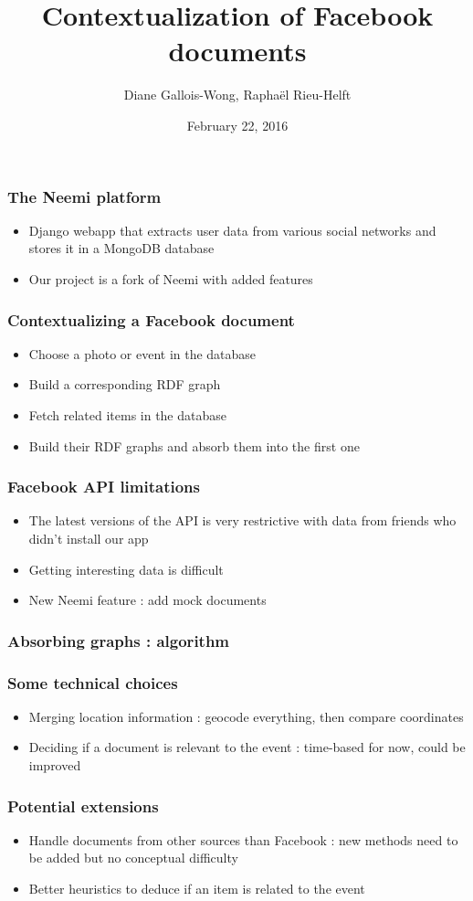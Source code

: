 \documentclass[18pt]{beamer}
\title{Contextualization of Facebook documents}
\author{Diane Gallois-Wong, Raphaël Rieu-Helft}
\date{February 22, 2016}
\begin{document}
\begin{frame}
	\titlepage
\end{frame}

\begin{frame}
	\frametitle{The Neemi platform}
\begin{itemize}
	\item{Django webapp that extracts user data from various social networks and stores it in a MongoDB database}
	\vspace{1em}
	\item{Our project is a fork of Neemi with added features}
\end{itemize}
\end{frame}

\begin{frame}
	\frametitle{Contextualizing a Facebook document}
	\begin{itemize}
		\item{Choose a photo or event in the database}
		\item{Build a corresponding RDF graph}
		\item{Fetch related items in the database}
		\item{Build their RDF graphs and absorb them into the first one}
	\end{itemize}
\end{frame}
\begin{frame}
	\frametitle{Facebook API limitations}
	\begin{itemize}
		\item{The latest versions of the API is very restrictive with data from friends who didn't install our app}
		\item{Getting interesting data is difficult}
		\item{New Neemi feature : add mock documents}
	\end{itemize}
\end{frame}
\begin{frame}
	\frametitle{Absorbing graphs : algorithm}
	
	
\end{frame}
\begin{frame}
	\frametitle{Some technical choices}
	\begin{itemize}
		\item{Merging location information : geocode everything, then compare coordinates}
		\item{Deciding if a document is relevant to the event : time-based for now, could be improved}
	\end{itemize}
\end{frame}
\begin{frame}
	\frametitle{Potential extensions}
	\begin{itemize}
		\item{Handle documents from other sources than Facebook : new methods need to be added but no conceptual difficulty}
		\item{Better heuristics to deduce if an item is related to the event}
	\end{itemize}
\end{frame}
\end{document}
